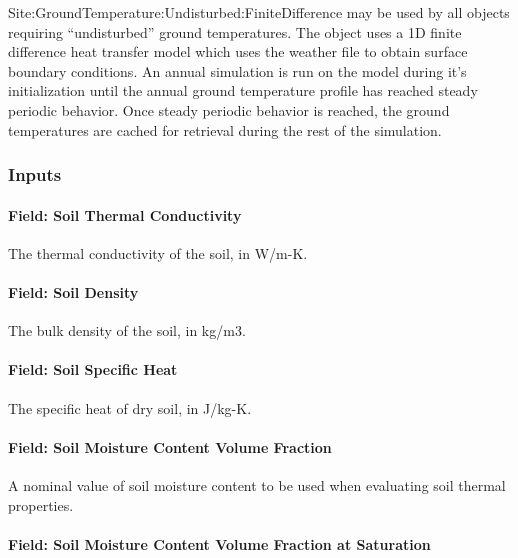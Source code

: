 Site:GroundTemperature:Undisturbed:FiniteDifference may be used by all objects requiring ``undisturbed'' ground temperatures. The object uses a 1D finite difference heat transfer model which uses the weather file to obtain surface boundary conditions. An annual simulation is run on the model during it's initialization until the annual ground temperature profile has reached steady periodic behavior. Once steady periodic behavior is reached, the ground temperatures are cached for retrieval during the rest of the simulation.

\subsubsection{Inputs}\label{inputs-14-007}

\paragraph{Field: Soil Thermal Conductivity}\label{field-soil-thermal-conductivity-000}

The thermal conductivity of the soil, in W/m-K.

\paragraph{Field: Soil Density}\label{field-soil-density-000}

The bulk density of the soil, in kg/m3.

\paragraph{Field: Soil Specific Heat}\label{field-soil-specific-heat-000}

The specific heat of dry soil, in J/kg-K.

\paragraph{Field: Soil Moisture Content Volume Fraction}\label{field-soil-moisture-content-volume-fraction}

A nominal value of soil moisture content to be used when evaluating soil thermal properties.

\paragraph{Field: Soil Moisture Content Volume Fraction at Saturation}\label{field-soil-moisture-content-volume-fraction-at-saturation}

